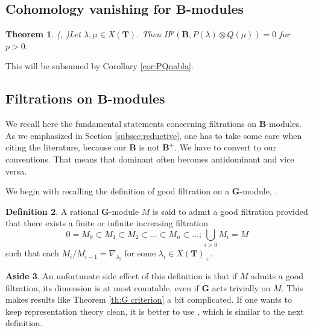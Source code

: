 \documentclass[sn-mathphys-num]{sn-jnl}%
\newcommand{\subsetq}{\subset}
\newcommand{\bg}{\mathbf G}
\newcommand{\fb}{\mathbf B}
\newcommand{\bt}{\mathbf T}
\newtheorem{theorem}{Theorem}[section]
\theoremstyle{definition}
\newtheorem{definition}[theorem]{Definition}%
\newtheorem{aside}[theorem]{Aside}
\begin{document}
\subsection{Cohomology vanishing for $\fb$-modules}

\begin{theorem}(\cite[Theorem 2.20(i)]{WvdK}, \cite[Theorem 3.2.6]{WvdKTata})\label{th:Tata Theorem 3.2.6}
Let $\lambda, \mu\in X({\bt})$. Then $H^p( \fb,P(\lambda)\otimes Q(\mu))=0$ for $p>0$.
\end{theorem}

This will be subsumed by Corollary  \ref{cor:PQnabla}.
\subsection{Filtrations on $\fb$-modules}

We recall here the fundamental statements concerning filtrations on $\fb$-modules. 
As we emphasized in Section \ref{subsec:reductive}, one has to take some care when citing the literature, 
because our $\fb$ is not $ \fb^+$. We have to convert to our conventions.
That means that dominant often becomes antidominant and vice versa. 

We begin with recalling the definition of good filtration on a $ \bg$-module, \cite{Donkin1}.

\begin{definition}
A rational $ \bg$-module $M$ is said to admit a good filtration provided that there exists a finite or infinite increasing filtration
$$
0=M_0\subsetq M_1\subsetq M_2\subsetq \dots \subsetq M_n\subsetq \dots ; \bigcup _{i>0} M_i = M
$$
such that each $M_i/M_{i-1}=\nabla _{\lambda_i}$ for some $\lambda_i \in X(\bt)_+$.
\end{definition}
\begin{aside}
An unfortunate side effect of this definition is that if $M$ admits a good filtration, its dimension is at most countable, even if $\bg$ acts trivially on $M$. 
This makes results like Theorem \ref{th:G criterion} a bit complicated.
If one wants to keep representation theory clean, it is better to use \cite[Definition 4.1.1]{WvdKTata}, 
which is similar to the next definition.
\end{aside}
\end{document}
